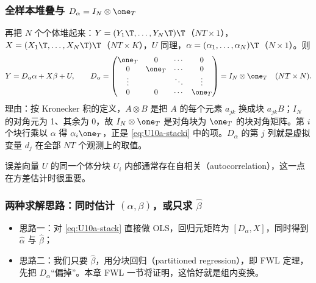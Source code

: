 \subsubsection{全样本堆叠与 \texorpdfstring{$D_\alpha=I_N\otimes\one_T$}{D = I\_N kron 1\_T}}

再把 $N$ 个个体堆起来：$Y=(Y_1\T,\dots,Y_N\T)\T$（$NT\times1$），$X=(X_1\T,\dots,X_N\T)\T$（$NT\times K$），$U$ 同理，$\alpha=(\alpha_1,\dots,\alpha_N)\T$（$N\times1$）。则
\begin{equation}\label{eq:U10a-stack}
Y=D_\alpha\alpha+X\beta+U,\qquad
D_\alpha=\begin{pmatrix}\one_T&0&\cdots&0\\0&\one_T&\cdots&0\\\vdots&&\ddots&\vdots\\0&0&\cdots&\one_T\end{pmatrix}=I_N\otimes\one_T\quad(NT\times N).
\end{equation}
理由：按 Kronecker 积的定义，$A\otimes B$ 是把 $A$ 的每个元素 $a_{jk}$ 换成块 $a_{jk}B$；$I_N$ 的对角元为 1、其余为 0，故 $I_N\otimes\one_T$ 是对角块为 $\one_T$ 的块对角矩阵。第 $i$ 个块行乘以 $\alpha$ 得 $\alpha_i\one_T$，正是 \eqref{eq:U10a-stacki} 中的项。$D_\alpha$ 的第 $j$ 列就是虚拟变量 $d_j$ 在全部 $NT$ 个观测上的取值。

误差向量 $U$ 的同一个体分块 $U_i$ 内部通常存在自相关（autocorrelation），这一点在方差估计时很重要。

\subsubsection{两种求解思路：同时估计 \texorpdfstring{$(\alpha,\beta)$}{(alpha, beta)}，或只求 \texorpdfstring{$\hat\beta$}{beta-hat}}

\begin{itemize}
  \item 思路一：对 \eqref{eq:U10a-stack} 直接做 OLS，回归元矩阵为 $[D_\alpha,X]$，同时得到 $\hat\alpha$ 与 $\hat\beta$；
  \item 思路二：我们只要 $\hat\beta$，用分块回归（partitioned regression），即 FWL 定理，先把 $D_\alpha$“偏掉”。本章 FWL 一节将证明，这恰好就是组内变换。
\end{itemize}

